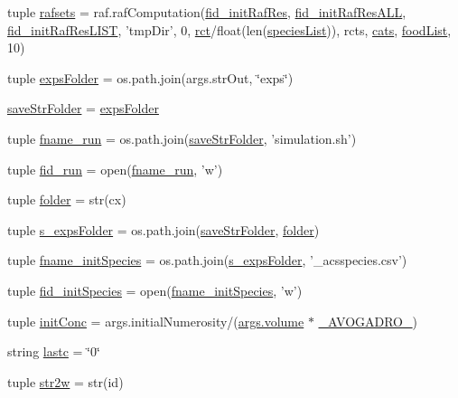 \begin{DoxyCompactItemize}
\item 
tuple \hyperlink{a00128_a36370edf2a6a4e19f0a99413aac43096}{rafsets} = raf.\+raf\+Computation(\hyperlink{a00128_a2f9cfe05abfed3ab6326d0cb094c7c80}{fid\+\_\+init\+Raf\+Res}, \hyperlink{a00128_add1c3bb75f1d98889c27099fc14fc6a8}{fid\+\_\+init\+Raf\+Res\+A\+L\+L}, \hyperlink{a00128_a7af2668de12720f3c7925527002d81b0}{fid\+\_\+init\+Raf\+Res\+L\+I\+S\+T}, 'tmp\+Dir', 0, \hyperlink{a00128_a61159eb5aec77b97808ce3fb742d8f6d}{rct}/float(len(\hyperlink{a00128_aff8baae5d4cd1678204477dd5e620775}{species\+List})), rcts, \hyperlink{a00128_aea4d714ca7ceaba151380b3aed7c34d8}{cats}, \hyperlink{a00128_a878da371fd02e9515fe7305e0a57be09}{food\+List}, 10)
\item 
tuple \hyperlink{a00128_aa78205fca6ef215871776684bc141b26}{exps\+Folder} = os.\+path.\+join(args.\+str\+Out, \char`\"{}exps\char`\"{})
\item 
\hyperlink{a00128_adf74f9028f6a6e9a2de2046146a29ffe}{save\+Str\+Folder} = \hyperlink{a00128_aa78205fca6ef215871776684bc141b26}{exps\+Folder}
\item 
tuple \hyperlink{a00128_a58053e5bf5bd9f634c82e6fe7a330770}{fname\+\_\+run} = os.\+path.\+join(\hyperlink{a00128_adf74f9028f6a6e9a2de2046146a29ffe}{save\+Str\+Folder}, 'simulation.\+sh')
\item 
tuple \hyperlink{a00128_a107606e6132ad38bc8591a7931a277fc}{fid\+\_\+run} = open(\hyperlink{a00128_a58053e5bf5bd9f634c82e6fe7a330770}{fname\+\_\+run}, 'w')
\item 
tuple \hyperlink{a00128_a42c0d5f9f5131fc14ddb04d765cee15b}{folder} = str(cx)
\item 
tuple \hyperlink{a00128_ad8daa0d6fb501f0e422c7fb04e93c7cd}{s\+\_\+exps\+Folder} = os.\+path.\+join(\hyperlink{a00128_adf74f9028f6a6e9a2de2046146a29ffe}{save\+Str\+Folder}, \hyperlink{a00128_a42c0d5f9f5131fc14ddb04d765cee15b}{folder})
\item 
tuple \hyperlink{a00128_a6053e1a97cef2ed661333b2a7b0cf67e}{fname\+\_\+init\+Species} = os.\+path.\+join(\hyperlink{a00128_ad8daa0d6fb501f0e422c7fb04e93c7cd}{s\+\_\+exps\+Folder}, '\+\_\+acsspecies.\+csv')
\item 
tuple \hyperlink{a00128_aac88079820753d1e8c6628b7016a71d5}{fid\+\_\+init\+Species} = open(\hyperlink{a00128_a6053e1a97cef2ed661333b2a7b0cf67e}{fname\+\_\+init\+Species}, 'w')
\item 
tuple \hyperlink{a00128_a4fad8527bf8c9b7981003678aba3edff}{init\+Conc} = args.\+initial\+Numerosity/(\hyperlink{a00113_a9bc498ccac8db41438f855f5dd3f4c05}{args.\+volume} $\ast$ \hyperlink{a00128_abfe2f871ea28e48198cdd5799807de5b}{\+\_\+\+A\+V\+O\+G\+A\+D\+R\+O\+\_\+})
\item 
string \hyperlink{a00128_ae1f2c64eb13a9c020ffe6ec073883573}{lastc} = \char`\"{}0\char`\"{}
\item 
tuple \hyperlink{a00128_a015e630bcbd779acd7f68bf514793e0d}{str2w} = str(id)
\end{DoxyCompactItemize}


